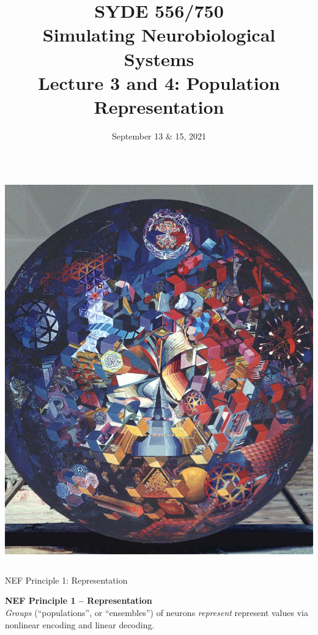\documentclass[handout,aspectratio=169]{beamer}
\date{September 13 \& 15, 2021}
\title{SYDE 556/750 \\ Simulating Neurobiological Systems \\ Lecture 3 and 4: Population Representation}
\begin{document}
	
\begin{frame}{}
	\vspace{0.5cm}
	\begin{columns}[c]
		\MakeTitle
		\includegraphics[width=\textwidth]{media/cubism_the_ultimate_painting_small.jpg}
	\end{columns}
\end{frame}



\begin{frame}{NEF Principle 1: Representation}
	\begin{mdframed}
		\textbf{NEF Principle 1 -- Representation}\\
		\emph{Groups} (\enquote{populations}, or \enquote{ensembles}) of neurons \emph{represent} represent values via nonlinear encoding and linear decoding.
	\end{mdframed}
\end{frame}
\end{document}
